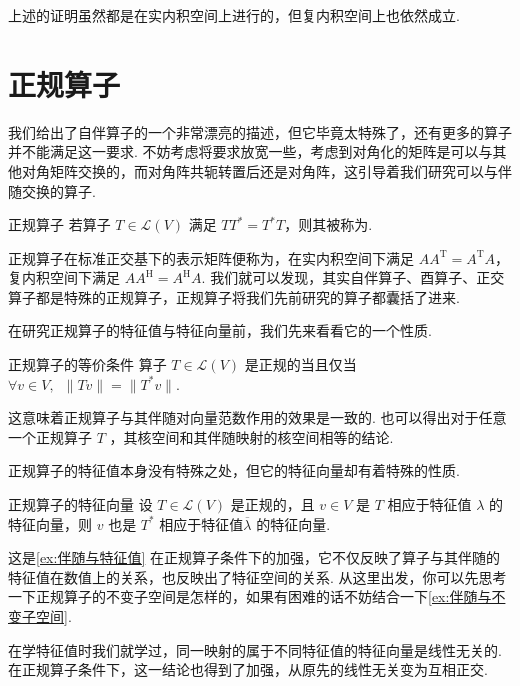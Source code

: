 上述的证明虽然都是在实内积空间上进行的，但复内积空间上也依然成立.

\section{正规算子}

我们给出了自伴算子的一个非常漂亮的描述，但它毕竟太特殊了，还有更多的算子并不能满足这一要求. 不妨考虑将要求放宽一些，考虑到对角化的矩阵是可以与其他对角矩阵交换的，而对角阵共轭转置后还是对角阵，这引导着我们研究可以与伴随交换的算子.

\begin{definition}{正规算子}{} 
    若算子 $ T \in \mathcal{L}(V) $ 满足 $ TT^* = T^*T $，则其被称为.
\end{definition}

正规算子在标准正交基下的表示矩阵便称为，在实内积空间下满足 $ AA^{\mathrm{T}} = A^{\mathrm{T}}A $，复内积空间下满足 $ AA^{\mathrm{H}} = A^{\mathrm{H}}A $. 我们就可以发现，其实自伴算子、酉算子、正交算子都是特殊的正规算子，正规算子将我们先前研究的算子都囊括了进来.

在研究正规算子的特征值与特征向量前，我们先来看看它的一个性质.

\begin{theorem}{}{正规算子的等价条件}
    算子 $ T \in \mathcal{L}(V) $ 是正规的当且仅当 $ \forall v \in V,\enspace \lVert Tv \rVert = \lVert T^*v \rVert $.
\end{theorem}

这意味着正规算子与其伴随对向量范数作用的效果是一致的. 也可以得出对于任意一个正规算子 $ T $ ，其核空间和其伴随映射的核空间相等的结论.

正规算子的特征值本身没有特殊之处，但它的特征向量却有着特殊的性质.

\begin{theorem}{}{正规算子的特征向量}
    设 $ T \in \mathcal{L}(V) $ 是正规的，且 $ v \in V $ 是 $ T $ 相应于特征值 $ \lambda $ 的特征向量，则 $ v $ 也是 $ T^* $ 相应于特征值$ \overline{\lambda} $ 的特征向量.
\end{theorem}

这是\autoref{ex:伴随与特征值} 在正规算子条件下的加强，它不仅反映了算子与其伴随的特征值在数值上的关系，也反映出了特征空间的关系. 从这里出发，你可以先思考一下正规算子的不变子空间是怎样的，如果有困难的话不妨结合一下\autoref{ex:伴随与不变子空间}.

在学特征值时我们就学过，同一映射的属于不同特征值的特征向量是线性无关的. 在正规算子条件下，这一结论也得到了加强，从原先的线性无关变为互相正交.

